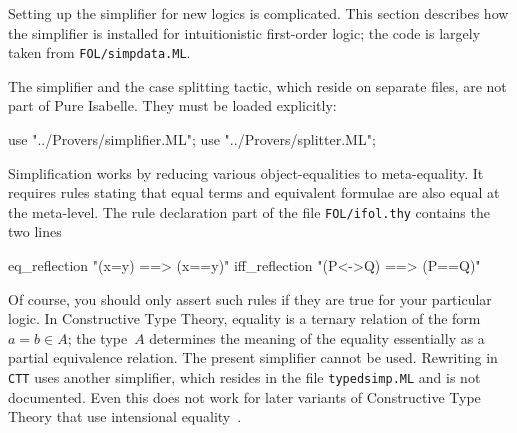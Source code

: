 Setting up the simplifier for new logics is complicated.  This section
describes how the simplifier is installed for intuitionistic first-order
logic; the code is largely taken from {\tt FOL/simpdata.ML}.

The simplifier and the case splitting tactic, which reside on separate
files, are not part of Pure Isabelle.  They must be loaded explicitly:
\begin{ttbox}
use "../Provers/simplifier.ML";
use "../Provers/splitter.ML";
\end{ttbox}

Simplification works by reducing various object-equalities to
meta-equality.  It requires rules stating that equal terms and equivalent
formulae are also equal at the meta-level.  The rule declaration part of
the file {\tt FOL/ifol.thy} contains the two lines
\begin{ttbox}
eq_reflection   "(x=y)   ==> (x==y)"
iff_reflection  "(P<->Q) ==> (P==Q)"
\end{ttbox}
Of course, you should only assert such rules if they are true for your
particular logic.  In Constructive Type Theory, equality is a ternary
relation of the form $a=b\in A$; the type~$A$ determines the meaning of the
equality essentially as a partial equivalence relation.  The present
simplifier cannot be used.  Rewriting in {\tt CTT} uses another simplifier,
which resides in the file {\tt typedsimp.ML} and is not documented.  Even
this does not work for later variants of Constructive Type Theory that use
intensional equality~\cite{nordstrom90}.


